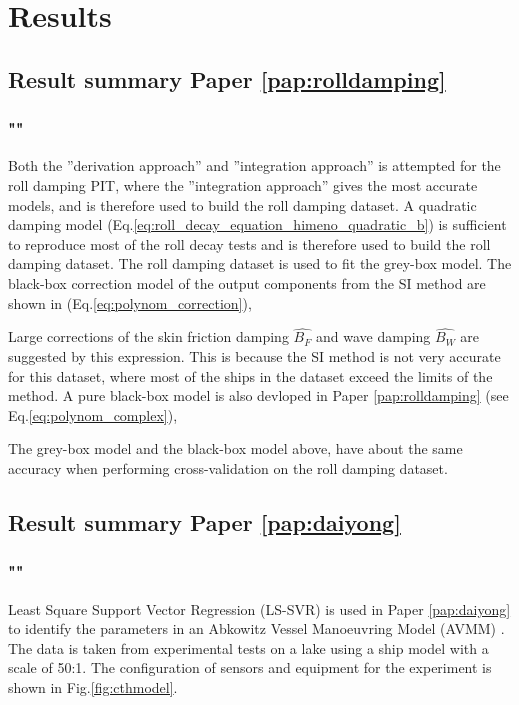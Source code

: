 \chapter{Results\label{ch:results}}

\section{Result summary Paper \ref{pap:rolldamping}}
\subsection*{""}
Both the ''derivation approach'' and ''integration approach'' is attempted for the roll damping PIT, where the ''integration approach'' gives the most accurate models, and is therefore used to build the roll damping dataset. A quadratic damping model (Eq.\ref{eq:roll_decay_equation_himeno_quadratic_b}) is sufficient to reproduce most of the roll decay tests and is therefore used to build the roll damping dataset. 
The roll damping dataset is used to fit the grey-box model. The black-box correction model of the output components from the SI method are shown in (Eq.\ref{eq:polynom_correction}),


\noindent Large corrections of the skin friction damping $\hat{B_F}$ and wave damping $\hat{B_W}$ are suggested by this expression. This is because the SI method is not very accurate for this dataset, where most of the ships in the dataset exceed the limits of the method. A pure black-box model is also devloped in Paper \ref{pap:rolldamping} (see Eq.\ref{eq:polynom_complex}),


\noindent The grey-box model and the black-box model above, have about the same accuracy when performing cross-validation on the roll damping dataset.

\section{Result summary Paper \ref{pap:daiyong}}
\subsection*{""}
Least Square Support Vector Regression (LS-SVR) \cite{brereton_support_2010} is used in Paper \ref{pap:daiyong} to identify the parameters in an Abkowitz Vessel Manoeuvring Model (AVMM) \cite{abkowitz_ship_1964}.  
The data is taken from experimental tests on a lake using a ship model with a scale of 50:1. The configuration of sensors and equipment for the experiment is shown in Fig.\ref{fig:cthmodel}.  


